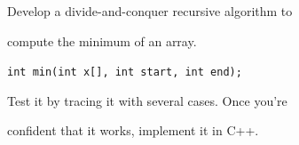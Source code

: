 Develop a divide-and-conquer recursive algorithm to

compute the minimum of an array.



\verb!int min(int x[], int start, int end);!



Test it by tracing it with several cases. Once you're

confident that it works, implement it in C++.


